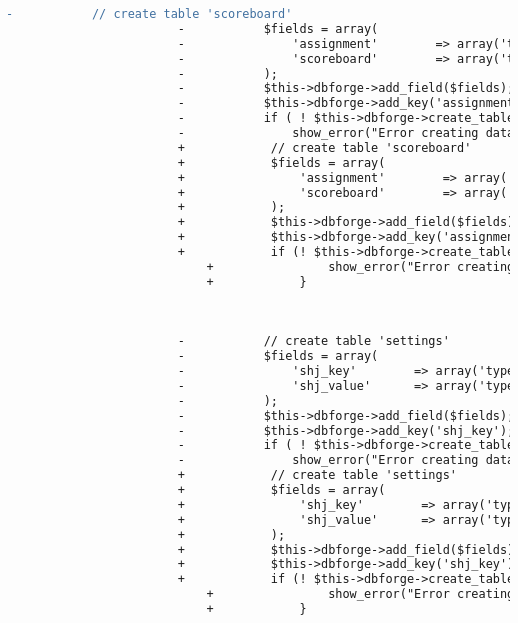 \begin{lstlisting}[language=diff, caption=Perubahan pada kode Install.php]
						-			// create table 'scoreboard'
						-			$fields = array(
						-				'assignment'        => array('type' => 'SMALLINT', 'constraint' => 4, 'unsigned' => TRUE),
						-				'scoreboard'        => array('type' => 'TEXT'),
						-			);
						-			$this->dbforge->add_field($fields);
						-			$this->dbforge->add_key('assignment');
						-			if ( ! $this->dbforge->create_table('scoreboard', TRUE))
						-				show_error("Error creating database table ".$this->db->dbprefix('scoreboard'));
						+            // create table 'scoreboard'
						+            $fields = array(
						+                'assignment'        => array('type' => 'SMALLINT', 'constraint' => 4, 'unsigned' => true),
						+                'scoreboard'        => array('type' => 'TEXT'),
						+            );
						+            $this->dbforge->add_field($fields);
						+            $this->dbforge->add_key('assignment');
						+            if (! $this->dbforge->create_table('scoreboard', true)) {
							+                show_error("Error creating database table ".$this->db->dbprefix('scoreboard'));
							+            }
						
						
						
						-			// create table 'settings'
						-			$fields = array(
						-				'shj_key'        => array('type' => 'VARCHAR', 'constraint' => 50),
						-				'shj_value'      => array('type' => 'TEXT'),
						-			);
						-			$this->dbforge->add_field($fields);
						-			$this->dbforge->add_key('shj_key');
						-			if ( ! $this->dbforge->create_table('settings', TRUE))
						-				show_error("Error creating database table ".$this->db->dbprefix('settings'));
						+            // create table 'settings'
						+            $fields = array(
						+                'shj_key'        => array('type' => 'VARCHAR', 'constraint' => 50),
						+                'shj_value'      => array('type' => 'TEXT'),
						+            );
						+            $this->dbforge->add_field($fields);
						+            $this->dbforge->add_key('shj_key');
						+            if (! $this->dbforge->create_table('settings', true)) {
							+                show_error("Error creating database table ".$this->db->dbprefix('settings'));
							+            }
						
						
						

\end{lstlisting}
